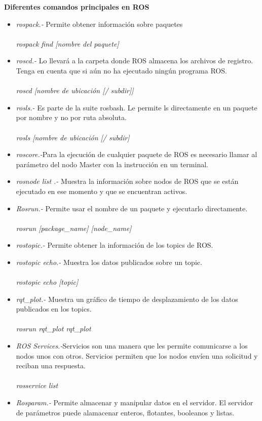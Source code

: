 \documentclass[12pt,a4paper]{article}
\begin{document}
\begin{center}
\textbf{Diferentes comandos principales en ROS}
\end{center}
\begin{itemize}
\item \textit{rospack.-} Permite obtener información sobre paquetes
\\\\
\textit{rospack find [nombre del paquete]}
\item \textit{roscd.-} Lo llevará a la carpeta donde ROS almacena los archivos de registro. Tenga en cuenta que si aún no ha ejecutado ningún programa ROS.
\\\\
\textit{roscd [nombre de ubicación [/ subdir]]}
\item \textit{rosls.-} Es parte de la suite rosbash. Le permite ls directamente en un paquete por nombre y no por ruta absoluta.
\\\\
\textit{rosls [nombre de ubicación [/ subdir]}
\item\textit{roscore.-}Para la ejecución de cualquier paquete de ROS es necesario llamar al parámetro del nodo Master con la instrucción en un terminal.
\item\textit{rosnode list .-} Muestra la información sobre nodos de ROS  que se están ejecutado en ese momento y que se encuentran activos.
\item\textit{Rosrun.-} Permite usar el nombre de un paquete y ejecutarlo directamente.
\\\\
\textit{rosrun [package\_name] [node\_name]}
\item\textit{rostopic.-} Permite obtener la información de los topics de ROS.
\item\textit{rostopic echo.-} Muestra los datos publicados sobre un topic.
\\\\
\textit{rostopic echo [topic]}
\item\textit{rqt\_plot.-} Muestra un gráfico de tiempo de desplazamiento de los datos publicados en los topics.
\\\\
\textit{rosrun rqt\_plot rqt\_plot}
\item\textit{ROS Services.-}Servicios son una manera que les permite comunicarse a los nodos unos con otros. Servicios permiten que los nodos envíen una solicitud y reciban una respuesta. 
\\\\
\textit{rosservice list} 
\item\textit{Rosparam.-} Permite almacenar y manipular datos en el servidor. El servidor de parámetros puede alamacenar enteros, flotantes, booleanos y listas.

\end{itemize}
\end{document}
